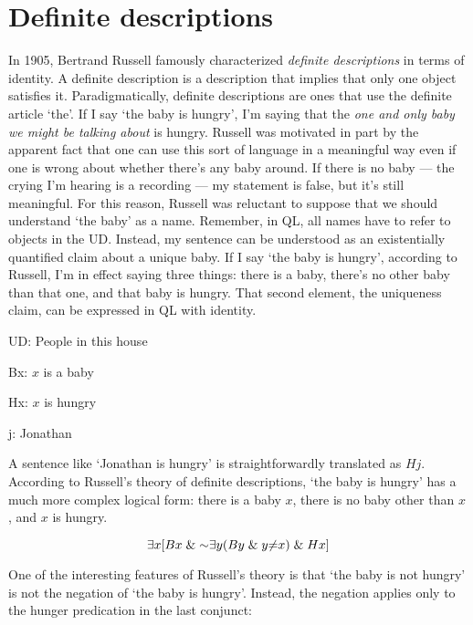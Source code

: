 \section{Definite descriptions}
\label{sec.defdesc}
In 1905, Bertrand Russell famously characterized \emph{definite descriptions} in terms of identity. A definite description is a description that implies that only one object satisfies it. Paradigmatically, definite descriptions are ones that use the definite article `the'. If I say `the baby is hungry', I'm saying that the \emph{one and only baby we might be talking about} is hungry. Russell was motivated in part by the apparent fact that one can use this sort of language in a meaningful way even if one is wrong about whether there's any baby around. If there is no baby --- the crying I'm hearing is a recording --- my statement is false, but it's still meaningful. For this reason, Russell was reluctant to suppose that we should understand `the baby' as a name. Remember, in QL, all names have to refer to objects in the UD. Instead, my sentence can be understood as an existentially quantified claim about a unique baby. If I say `the baby is hungry', according to Russell, I'm in effect saying three things: there is a baby, there's no other baby than that one, and that baby is hungry. That second element, the uniqueness claim, can be expressed in QL with identity. 

\begin{ekey}
\item[UD:]People in this house
\item[Bx:]$x$ is a baby
\item[Hx:]$x$ is hungry
\item[j:]Jonathan
\end{ekey}

A sentence like `Jonathan is hungry' is straightforwardly translated as $Hj$. According to Russell's theory of definite descriptions, `the baby is hungry' has a much more complex logical form: there is a baby $x$, there is no baby other than $x$, and $x$ is hungry.

\begin{equation*}
\qt{\exists}{x} [Bx \eand \enot \qt{\exists}{y} (By \eand y {\neq} x) \eand Hx]
\end{equation*}

One of the interesting features of Russell's theory is that `the baby is not hungry' is not the negation of `the baby is hungry'. Instead, the negation applies only to the hunger predication in the last conjunct:

